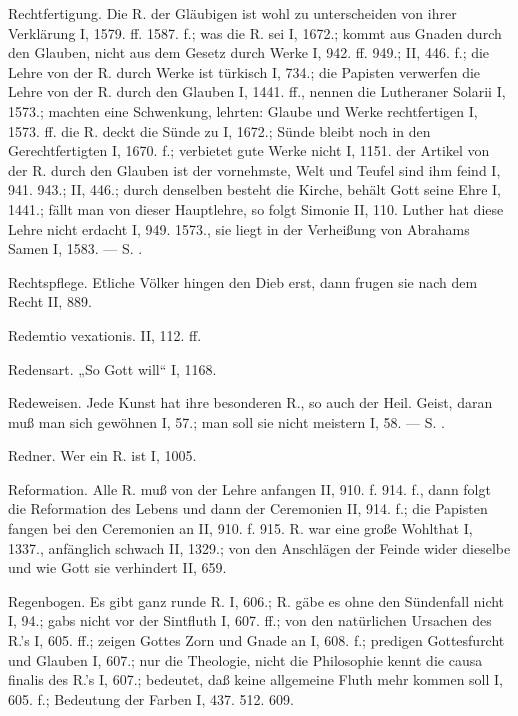 Rechtfertigung.  Die R. der Gläubigen ist wohl zu unterscheiden von ihrer Verklärung I, 1579. ff. 1587. f.; was die R. sei I, 1672.; kommt aus Gnaden durch den Glauben, nicht aus dem Gesetz durch Werke I, 942. ff. 949.; II, 446. f.; die Lehre von der R. durch Werke ist türkisch I, 734.; die Papisten verwerfen die Lehre von der R. durch den Glauben I, 1441. ff., nennen die Lutheraner Solarii I, 1573.; machten eine Schwenkung, lehrten: Glaube und Werke rechtfertigen I, 1573. ff.  die R. deckt die Sünde zu I, 1672.; Sünde bleibt noch in den Gerechtfertigten I, 1670. f.; verbietet gute Werke nicht I, 1151.  der Artikel von der R. durch den Glauben ist der vornehmste, Welt und Teufel sind ihm feind I, 941. 943.; II, 446.; durch denselben besteht die Kirche, behält Gott seine Ehre I, 1441.; fällt man von dieser Hauptlehre, so folgt Simonie II, 110.  Luther hat diese Lehre nicht erdacht I, 949. 1573., sie liegt in der Verheißung von Abrahams Samen I, 1583. — S. .

Rechtspflege. Etliche Völker hingen den Dieb erst, dann frugen sie nach dem Recht II, 889.

Redemtio vexationis. II, 112. ff.

Redensart. „So Gott will“ I, 1168.

Redeweisen. Jede Kunst hat ihre besonderen R., so auch der Heil. Geist, daran muß man sich gewöhnen I, 57.; man soll sie nicht meistern I, 58. — S. .

Redner. Wer ein R. ist I, 1005.

Reformation. Alle R. muß von der Lehre anfangen II, 910. f. 914. f., dann folgt die Reformation des Lebens und dann der Ceremonien II, 914. f.; die Papisten fangen bei den Ceremonien an II, 910. f. 915. R.  war eine große Wohlthat I, 1337., anfänglich schwach II, 1329.; von den Anschlägen der Feinde wider dieselbe und wie Gott sie verhindert II, 659.

Regenbogen. Es gibt ganz runde R. I, 606.; R. gäbe es ohne den Sündenfall nicht I, 94.; gabs nicht vor der Sintfluth I, 607. ff.; von den natürlichen Ursachen des R.’s I, 605. ff.; zeigen Gottes Zorn und Gnade an I, 608. f.; predigen Gottesfurcht und Glauben I, 607.; nur die Theologie, nicht die Philosophie kennt die causa finalis des R.’s I, 607.; bedeutet, daß keine allgemeine Fluth mehr kommen soll I, 605. f.; Bedeutung der Farben I, 437. 512. 609.

